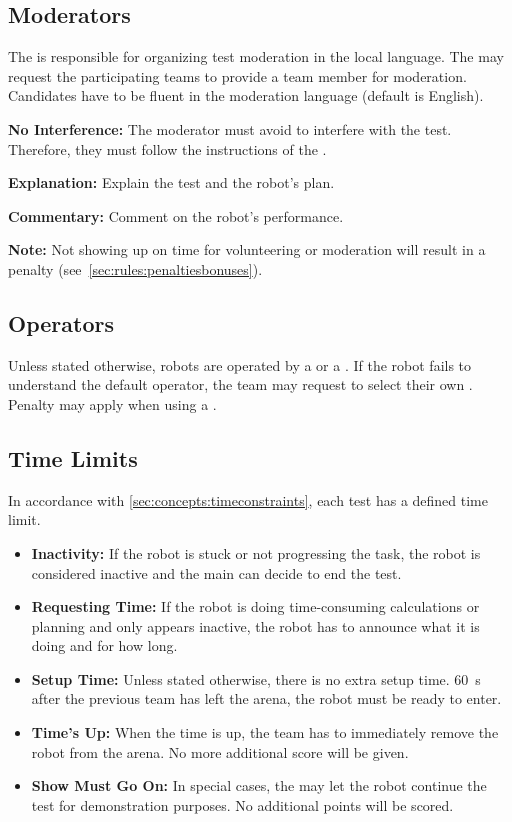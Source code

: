 \subsection{Moderators}
\label{sec:rules:moderators}
The  is responsible for organizing test moderation in the local language. The  may request the participating teams to provide a team member for moderation. Candidates have to be fluent in the moderation language (default is English).
\begin{compactitem}
	\item \textbf{No Interference:} The moderator must avoid to interfere with the test. Therefore, they must follow the instructions of the \Referees{}.
	\item \textbf{Explanation:} Explain the test and the robot's plan.
	\item \textbf{Commentary:} Comment on the robot's performance.
\end{compactitem}

\noindent \textbf{Note:} Not showing up on time for volunteering or moderation will result in a penalty (see~\ref{sec:rules:penaltiesbonuses}).

\subsection{Operators}
\label{sec:rules:operators}
Unless stated otherwise, robots are operated by a \Referee{} or a \Volunteer{}. If the robot fails to understand the default operator, the team may request to select their own \CustomOperator{}. Penalty may apply when using a \CustomOperator{}.


\subsection{Time Limits}
\label{rule:time_limits}
In accordance with \ref{sec:concepts:timeconstraints}, each test has a defined time limit.
\begin{itemize}
	\item \textbf{Inactivity:} If the robot is stuck or not progressing the task, the robot is considered inactive and the main \Referee{} can decide to end the test. 

	\item \textbf{Requesting Time:} If the robot is doing time-consuming calculations or planning and only appears inactive, the robot has to announce what it is doing and for how long.

	\item \textbf{Setup Time:} Unless stated otherwise, there is no extra setup time. \SI{60}{\second} after the previous team has left the arena, the robot must be ready to enter. 

	\item \textbf{Time's Up:} When the time is up, the team has to immediately remove the robot from the arena.
	No more additional score will be given.

	\item \textbf{Show Must Go On:} In special cases, the \Referee{} may let the robot continue the test for demonstration purposes. No additional points will be scored.
\end{itemize}

